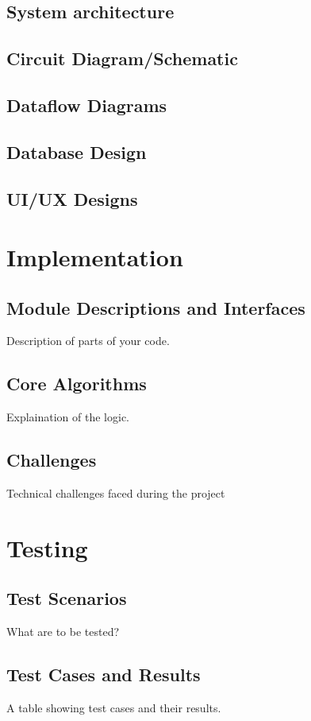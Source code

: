 \documentclass[minor, project]{gptcmdy}
\begin{document}
\section{System architecture}

\section{Circuit Diagram/Schematic}

\section{Dataflow Diagrams}

\section{Database Design}

\section{UI/UX Designs}


\chapter{Implementation}
\section{Module Descriptions and Interfaces}
Description of parts of your code.

\section{Core Algorithms}
Explaination of the logic.

\section{Challenges}
Technical challenges faced during the project


\chapter{Testing}
\section{Test Scenarios}
What are to be tested?

\section{Test Cases and Results}
A table showing test cases and their results.
\end{document}
